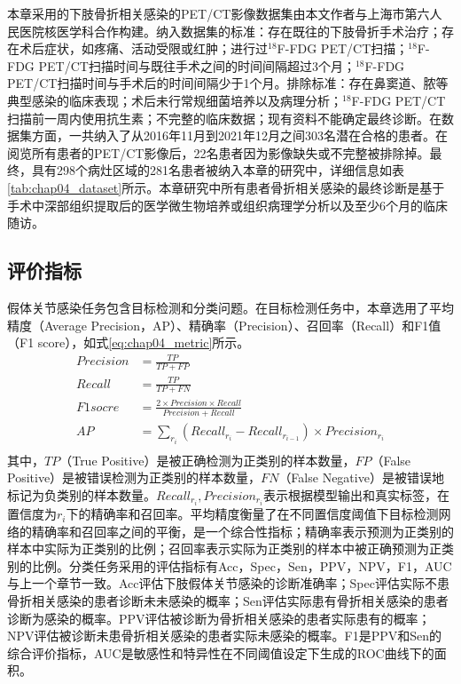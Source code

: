本章采用的下肢骨折相关感染的PET/CT影像数据集由本文作者与上海市第六人民医院核医学科合作构建。纳入数据集的标准：存在既往的下肢骨折手术治疗；存在术后症状，如疼痛、活动受限或红肿；进行过\(^{18}\)F-FDG PET/CT扫描；\(^{18}\)F-FDG PET/CT扫描时间与既往手术之间的时间间隔超过3个月；\(^{18}\)F-FDG PET/CT扫描时间与手术后的时间间隔少于1个月。排除标准：存在鼻窦道、脓等典型感染的临床表现；术后未行常规细菌培养以及病理分析；\(^{18}\)F-FDG PET/CT扫描前一周内使用抗生素；不完整的临床数据；现有资料不能确定最终诊断。在数据集方面，一共纳入了从2016年11月到2021年12月之间303名潜在合格的患者。在阅览所有患者的PET/CT影像后，22名患者因为影像缺失或不完整被排除掉。最终，具有298个病灶区域的281名患者被纳入本章的研究中，详细信息如表\ref{tab:chap04_dataset}所示。本章研究中所有患者骨折相关感染的最终诊断是基于手术中深部组织提取后的医学微生物培养或组织病理学分析以及至少6个月的临床随访。

\subsection{评价指标}

假体关节感染任务包含目标检测和分类问题。在目标检测任务中，本章选用了平均精度（Average Precision，AP）、精确率（Precision）、召回率（Recall）和F1值（F1 score），如式\ref{eq:chap04_metric}所示。
\begin{equation}
    \begin{aligned}
        Precision & = \frac{TP}{TP+FP}                                                   \\
        Recall    & = \frac{TP}{TP+FN}                                                   \\
        F1 socre  & = \frac{2 \times Precision \times Recall}{Precision + Recall}        \\
        AP        & = \sum_{r_i}(Recall_{r_i} - Recall_{r_{i-1}}) \times Precision_{r_i} \\
    \end{aligned}
    \label{eq:chap04_metric}
\end{equation}
其中，\(TP\)（True Positive）是被正确检测为正类别的样本数量，\(FP\)（False Positive）是被错误检测为正类别的样本数量，\(FN\)（False Negative）是被错误地标记为负类别的样本数量。\(Recall_{r_i}, Precision_{r_i}\)表示根据模型输出和真实标签，在置信度为\(r_i\)下的精确率和召回率。平均精度衡量了在不同置信度阈值下目标检测网络的精确率和召回率之间的平衡，是一个综合性指标；精确率表示预测为正类别的样本中实际为正类别的比例；召回率表示实际为正类别的样本中被正确预测为正类别的比例。分类任务采用的评估指标有Acc，Spec，Sen，PPV，NPV，F1，AUC与上一个章节一致。Acc评估下肢假体关节感染的诊断准确率；Spec评估实际不患骨折相关感染的患者诊断未未感染的概率；Sen评估实际患有骨折相关感染的患者诊断为感染的概率。PPV评估被诊断为骨折相关感染的患者实际患有的概率；NPV评估被诊断未患骨折相关感染的患者实际未感染的概率。F1是PPV和Sen的综合评价指标，AUC是敏感性和特异性在不同阈值设定下生成的ROC曲线下的面积。

